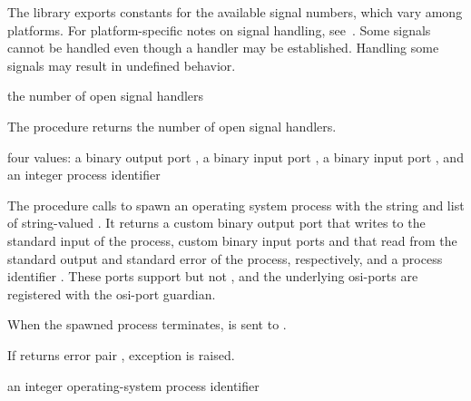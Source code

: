The  library exports constants for the available signal
numbers, which vary among platforms.
For platform-specific notes on signal handling, see~\cite{libuv}.
Some signals cannot be handled even though a handler may be established.
Handling some signals may result in undefined behavior.

\begin{procedure}
\end{procedure}
\returns{} the number of open signal handlers

The  procedure returns the number of open
signal handlers.

\begin{procedure}
\end{procedure}
\returns{} four values: a binary output port , a binary
input port , a binary input port ,
and an integer process identifier 

The  procedure calls  to spawn
an operating system process with the string  and list of
string-valued . It returns a custom binary output port
 that writes to the standard input of the process,
custom binary input ports  and  that
read from the standard output and standard error of the process,
respectively, and a process identifier . These ports
support  but not , and
the underlying osi-ports are registered with the osi-port
guardian.

When the spawned process terminates,  is sent to
.

If  returns error pair , exception  is raised.

\begin{procedure}
\end{procedure}
\returns{} an integer operating-system process identifier

